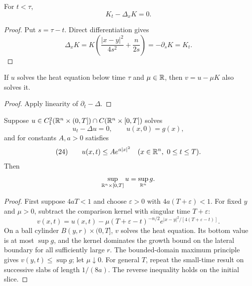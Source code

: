 \begin{lemma}
\label{lem:comparison-kernel-solves-heat}





For $t<\tau$,
$$K_t-\Delta_xK=0.$$
\end{lemma}
\begin{proof}

\sketch Put $s=\tau-t$. Direct differentiation gives
$$\Delta_xK=K\left(\frac{|x-y|^2}{4s^2}+\frac n{2s}\right)
=-\partial_sK=K_t.$$
\end{proof}

\begin{lemma}
\label{lem:comparison-function-solves-heat}





If $u$ solves the heat equation below time $\tau$ and $\mu\in\mathbb{R}$, then
$v=u-\mu K$ also solves it.
\end{lemma}
\begin{proof}

\sketch Apply linearity of $\partial_t-\Delta$.
\end{proof}

\begin{theorem}
\label{thm:maximum-principle-heat-cauchy-problem}





Suppose $u\in C_1^2(\mathbb{R}^n\times(0,T])\cap C(\mathbb{R}^n\times[0,T])$ solves
$$u_t-\Delta u=0,
\qquad
u(x,0)=g(x),$$
and for constants $A,a>0$ satisfies
$$(24)\qquad u(x,t)\le Ae^{a|x|^2}
\quad(x\in\mathbb{R}^n,\ 0\le t\le T).$$
Then
$$\sup_{\mathbb{R}^n\times[0,T]}u=\sup_{\mathbb{R}^n}g.$$
\end{theorem}
\begin{proof}
\sketch First suppose $4aT<1$ and choose $\varepsilon>0$ with
$4a(T+\varepsilon)<1$. For fixed $y$ and $\mu>0$, subtract the comparison
kernel with singular time $T+\varepsilon$:
$$v(x,t)=u(x,t)-\mu(T+\varepsilon-t)^{-n/2}
e^{|x-y|^2/[4(T+\varepsilon-t)]}.$$
On a ball cylinder $B(y,r)\times(0,T]$, $v$ solves the heat equation. Its
bottom value is at most $\sup g$, and the kernel dominates the growth bound
on the lateral boundary for all sufficiently large $r$. The bounded-domain
maximum principle gives $v(y,t)\le\sup g$; let $\mu\downarrow0$. For general
$T$, repeat the small-time result on successive slabs of length $1/(8a)$.
The reverse inequality holds on the initial slice.
\end{proof}

